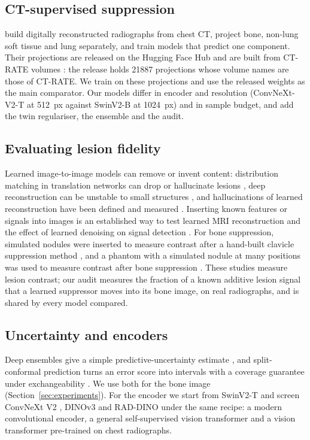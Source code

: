 \subsection{CT-supervised suppression}
\citet{angaitkar2026anatomy} build digitally reconstructed radiographs from chest CT, project bone, non-lung soft tissue and lung
separately, and train models that predict one component. Their projections are released on the Hugging Face Hub and are built from CT-RATE volumes
\citep{hamamci2026ctrate}: the release holds \num{21887} projections whose volume names are those of CT-RATE. We train on these projections and use the released weights as the main comparator. Our models differ in encoder and resolution (ConvNeXt-V2-T
at 512~px against SwinV2-B at 1024~px) and in sample budget, and add the twin regulariser, the ensemble and the audit.

\subsection{Evaluating lesion fidelity}
Learned image-to-image models can remove or invent content: distribution matching in translation networks can drop or hallucinate lesions
\citep{cohen2018distribution}, deep reconstruction can be unstable to small structures \citep{antun2020instabilities}, and hallucinations of
learned reconstruction have been defined and measured \citep{bhadra2021hallucinations,tivnan2024hallucination}. Inserting known features or signals into
images is an established way to test learned MRI reconstruction \citep{cheng2020addressing} and the effect of learned denoising on signal
detection \citep{li2021assessing}. For bone
suppression, simulated nodules were inserted to measure contrast after a hand-built clavicle suppression method \citep{hogeweg2013suppression},
and a phantom with a simulated nodule at many positions was used to measure contrast after bone suppression \citep{takagi2020dose}. These
studies measure lesion contrast; our audit measures the fraction of a known additive lesion signal that a learned suppressor moves into its
bone image, on real radiographs, and is shared by every model compared.

\subsection{Uncertainty and encoders}
Deep ensembles give a simple predictive-uncertainty estimate \citep{lakshminarayanan2017ensembles}, and split-conformal prediction turns an error score into
intervals with a coverage guarantee under exchangeability \citep{lei2018conformal,angelopoulos2023conformal}. We use both for the bone image
(Section~\ref{sec:experiments}). For the encoder we start from SwinV2-T \citep{liu2022swinv2} and screen ConvNeXt V2 \citep{woo2023convnextv2},
DINOv3 \citep{simeoni2025dinov3} and RAD-DINO \citep{perezgarcia2025raddino} under the same recipe: a modern convolutional encoder, a general
self-supervised vision transformer and a vision transformer pre-trained on chest radiographs.

